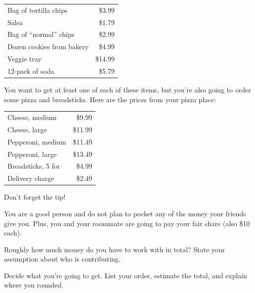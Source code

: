\documentclass[12pt]{ximera}
\begin{document}
\begin{center}
\begin{tabular}{lr}
Bag of tortilla chips & \$3.99 \\
Salsa & \$1.79 \\
Bag of ``normal'' chips & \$2.99 \\
Dozen cookies from bakery & \$4.99 \\
Veggie tray & \$14.99 \\
12-pack of soda & \$5.79 \\
\end{tabular}
\end{center}

You want to get at least one of each of these items, but you're also going to order
some pizza and breadsticks. Here are the prices from your pizza place:

\begin{center}
\begin{tabular}{lr}
Cheese, medium & \$9.99 \\
Cheese, large & \$11.99 \\
Pepperoni, medium & \$11.49 \\
Pepperoni, large & \$13.49 \\
Breadsticks, 5 for & \$4.99 \\
Delivery charge & \$2.49 \\
\end{tabular}
\end{center}

Don't forget the tip!

You are a good person and do not plan to pocket any of the money your friends give
you. Plus, you and your roommate are going to pay your fair share (also \$10 each).


\begin{problem}
Roughly how much money do you have to work with in total? State your assumption about
who is contributing.

\begin{freeResponse}
\end{freeResponse}
\end{problem}

\begin{problem}
Decide what you're going to get. List your order, estimate the total, and explain
where you rounded.

\begin{freeResponse}
\end{freeResponse}
\end{problem}
\end{document}
